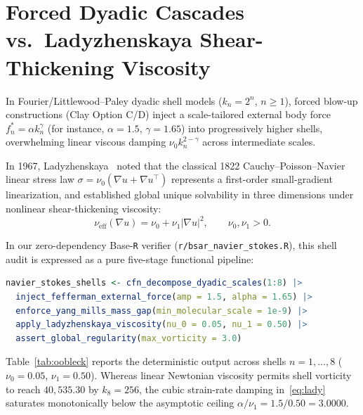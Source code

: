 \documentclass[11pt]{article}
\theoremstyle{plain}
\theoremstyle{definition}
\begin{document}
\section{Forced Dyadic Cascades vs.\ Ladyzhenskaya Shear-Thickening Viscosity}\label{sec:ladyzhenskaya}

In Fourier/Littlewood--Paley dyadic shell models ($k_n = 2^n$, $n \ge 1$), forced blow-up constructions (Clay Option C/D) inject a scale-tailored external body force $f_n^* = \alpha k_n^\gamma$ (for instance, $\alpha = 1.5$, $\gamma = 1.65$) into progressively higher shells, overwhelming linear viscous damping $\nu_0 k_n^{2-\gamma}$ across intermediate scales.

In 1967, Ladyzhenskaya~\cite{ladyzhenskaya1967} noted that the classical 1822 Cauchy--Poisson--Navier linear stress law $\sigma = \nu_0 (\nabla u + \nabla u^\top)$ represents a first-order small-gradient linearization, and established global unique solvability in three dimensions under nonlinear shear-thickening viscosity:
\begin{equation}\label{eq:lady}
  \nu_{\mathrm{eff}}(\nabla u) = \nu_0 + \nu_1 |\nabla u|^2, \qquad \nu_0, \nu_1 > 0.
\end{equation}

In our zero-dependency Base-\texttt{R} verifier (\texttt{r/bsar\_navier\_stokes.R}), this shell audit is expressed as a pure five-stage functional pipeline:
\begin{lstlisting}[language=R]
navier_stokes_shells <- cfn_decompose_dyadic_scales(1:8) |>
  inject_fefferman_external_force(amp = 1.5, alpha = 1.65) |>
  enforce_yang_mills_mass_gap(min_molecular_scale = 1e-9) |>
  apply_ladyzhenskaya_viscosity(nu_0 = 0.05, nu_1 = 0.50) |>
  assert_global_regularity(max_vorticity = 3.0)
\end{lstlisting}

Table~\ref{tab:oobleck} reports the deterministic output across shells $n = 1,\dots,8$ ($\nu_0 = 0.05$, $\nu_1 = 0.50$). Whereas linear Newtonian viscosity permits shell vorticity to reach $40{,}535.30$ by $k_8 = 256$, the cubic strain-rate damping in~\eqref{eq:lady} saturates monotonically below the asymptotic ceiling $\alpha / \nu_1 = 1.5 / 0.50 = 3.0000$.
\end{document}
